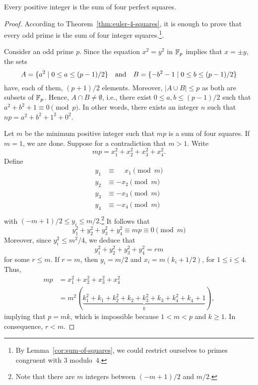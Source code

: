 \begin{thm}\label{thm:lagrange} {\upshape[Lagrange]}
    Every positive integer is the sum of four perfect squares.
\end{thm}

\begin{proof}
    According to Theorem~\ref{thm:euler-4-squares}, it is enough to prove that every odd prime is the sum of four integer squares.\footnote{By Lemma~\ref{cor:sum-of-squares}, we could restrict ourselves to primes congruent with $3$ modulo~$4$.}.
    
    Consider an odd prime $p$. Since the equation $x^2=y^2$ in $\Fpn[]$ implies that $x=\pm y$, the sets
    $$
        A=\set{a^2\mid0\le a\le (p-1)/2}
        \quad\text{and}\quad
        B=\set{-b^2-1\mid0\le b\le (p-1)/2}
    $$
    have, each of them, $(p+1)/2$ elements. Moreover, $|A\cup B|\le p$ as both are subsets of $\Fpn[]$. Hence, $A\cap B\ne\emptyset$, i.e., there exist $0\le a,b\le(p-1)/2$ such that $a^2+b^2+1\equiv0\pmod p$. In other words, there exists an integer $n$ such that $np = a^2+b^2+1^2+0^2$.

    Let $m$ be the minimum positive integer such that $mp$ is a sum of four squares. If $m=1$, we are done. Suppose for a contradiction that $m>1$. Write
    $$
        mp = x_1^2+x_2^2+x_3^2+x_4^2.
    $$
    Define
    \begin{align*}
        y_1&\equiv \phantom-x_1\pmod m\\
        y_2&\equiv -x_2\pmod m\\
        y_3&\equiv -x_3\pmod m\\
        y_4&\equiv -x_4\pmod m\\
    \end{align*}
    with $(-m+1)/2\le y_i\le m/2$.\footnote{Note that there are $m$ integers between $(-m+1)/2$ and $m/2$.} It follows that
    $$
        y_1^2+y_2^2+y_3^2+y_4^2\equiv mp\equiv0\pmod m
    $$
    Moreover, since $y_i^2\le m^2/4$, we deduce that
    $$
        y_1^2+y_2^2+y_3^2+y_4^2=rm
    $$
    for some $r\le m$. If $r=m$, then $y_i=m/2$ and $x_i=m(k_i+1/2)$, for $1\le i\le 4$. Thus,
    \begin{align*}
        mp &= x_1^2+x_2^2+x_3^2+x_4^2\\
            &= m^2(\underbrace{k_1^2+k_1+k_2^2+k_2+k_3^2+k_3+k_4^2+k_4+1}_k),
    \end{align*}
    implying that $p=mk$, which is impossible because $1<m<p$ and $k\ge1$. In consequence, $r<m$.


\end{proof}
